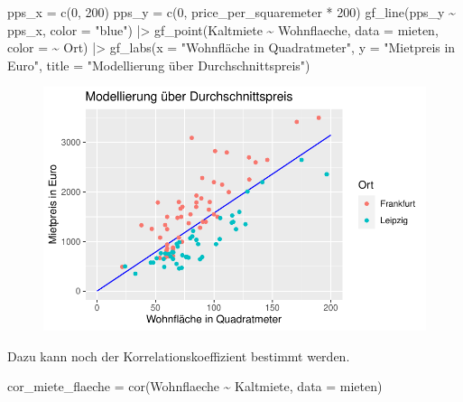 \documentclass[
  a4paper,
  DIV=11]{scrartcl}
\newenvironment{Shaded}{\begin{snugshade}}{\end{snugshade}}
\newcommand{\AttributeTok}[1]{\textcolor[rgb]{0.40,0.45,0.13}{#1}}
\newcommand{\DecValTok}[1]{\textcolor[rgb]{0.68,0.00,0.00}{#1}}
\newcommand{\FunctionTok}[1]{\textcolor[rgb]{0.28,0.35,0.67}{#1}}
\newcommand{\NormalTok}[1]{\textcolor[rgb]{0.00,0.23,0.31}{#1}}
\newcommand{\OtherTok}[1]{\textcolor[rgb]{0.00,0.23,0.31}{#1}}
\newcommand{\SpecialCharTok}[1]{\textcolor[rgb]{0.37,0.37,0.37}{#1}}
\newcommand{\StringTok}[1]{\textcolor[rgb]{0.13,0.47,0.30}{#1}}
\begin{document}
\begin{Shaded}
\begin{Highlighting}[]
\NormalTok{pps\_x }\OtherTok{=} \FunctionTok{c}\NormalTok{(}\DecValTok{0}\NormalTok{, }\DecValTok{200}\NormalTok{)}
\NormalTok{pps\_y }\OtherTok{=} \FunctionTok{c}\NormalTok{(}\DecValTok{0}\NormalTok{, price\_per\_squaremeter }\SpecialCharTok{*} \DecValTok{200}\NormalTok{)}
\FunctionTok{gf\_line}\NormalTok{(pps\_y }\SpecialCharTok{\textasciitilde{}}\NormalTok{ pps\_x, }\AttributeTok{color =} \StringTok{"blue"}\NormalTok{) }\SpecialCharTok{|\textgreater{}} 
  \FunctionTok{gf\_point}\NormalTok{(Kaltmiete }\SpecialCharTok{\textasciitilde{}}\NormalTok{ Wohnflaeche, }\AttributeTok{data =}\NormalTok{ mieten, }\AttributeTok{color =} \SpecialCharTok{\textasciitilde{}}\NormalTok{ Ort) }\SpecialCharTok{|\textgreater{}} 
  \FunctionTok{gf\_labs}\NormalTok{(}\AttributeTok{x =} \StringTok{"Wohnfläche in Quadratmeter"}\NormalTok{, }
          \AttributeTok{y =} \StringTok{"Mietpreis in Euro"}\NormalTok{, }
          \AttributeTok{title =} \StringTok{"Modellierung über Durchschnittspreis"}\NormalTok{)}
\end{Highlighting}
\end{Shaded}

\begin{figure}[H]

{\centering \includegraphics{Mietmodellierung_files/figure-pdf/unnamed-chunk-17-1.pdf}

}

\end{figure}

Dazu kann noch der Korrelationskoeffizient bestimmt werden.

\begin{Shaded}
\begin{Highlighting}[]
\NormalTok{cor\_miete\_flaeche }\OtherTok{=} \FunctionTok{cor}\NormalTok{(Wohnflaeche }\SpecialCharTok{\textasciitilde{}}\NormalTok{ Kaltmiete, }\AttributeTok{data =}\NormalTok{ mieten)}
\end{Highlighting}
\end{Shaded}
\end{document}
